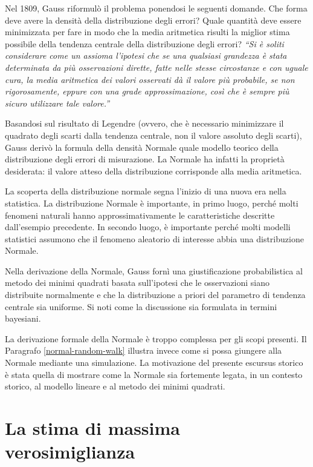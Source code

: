 \documentclass[
  11pt,
]{krantz}
\theoremstyle{definition}
\theoremstyle{definition}
\theoremstyle{definition}
\theoremstyle{definition}
\theoremstyle{remark}
\begin{document}
Nel 1809, Gauss riformulò il problema ponendosi le seguenti domande. Che forma deve avere la densità della distribuzione degli errori? Quale quantità deve essere minimizzata per fare in modo che la media aritmetica risulti la miglior stima possibile della tendenza centrale della distribuzione degli errori? \emph{``Si è soliti considerare come un assioma l'ipotesi che se una qualsiasi grandezza è stata determinata da più osservazioni dirette, fatte nelle stesse circostanze e con uguale cura, la media aritmetica dei valori osservati dà il valore più probabile, se non rigorosamente, eppure con una grade approssimazione, così che è sempre più sicuro utilizzare tale valore.''}

Basandosi sul risultato di Legendre (ovvero, che è necessario minimizzare il quadrato degli scarti dalla tendenza centrale, non il valore assoluto degli scarti), Gauss derivò la formula della densità Normale quale modello teorico della distribuzione degli errori di misurazione. La Normale ha infatti la proprietà desiderata: il valore atteso della distribuzione corrisponde alla media aritmetica.

La scoperta della distribuzione normale segna l'inizio di una nuova era nella statistica. La distribuzione Normale è importante, in primo luogo, perché molti fenomeni naturali hanno approssimativamente le caratteristiche descritte dall'esempio precedente. In secondo luogo, è importante perché molti modelli statistici assumono che il fenomeno aleatorio di interesse abbia una distribuzione Normale.

Nella derivazione della Normale, Gauss fornì una giustificazione probabilistica al metodo dei minimi quadrati basata sull'ipotesi che le osservazioni siano distribuite normalmente e che la distribuzione a priori del parametro di tendenza centrale sia uniforme. Si noti come la discussione sia formulata in termini bayesiani.

La derivazione formale della Normale è troppo complessa per gli scopi presenti. Il Paragrafo \ref{normal-random-walk} illustra invece come si possa giungere alla Normale mediante una simulazione. La motivazione del presente escursus storico è stata quella di mostrare come la Normale sia fortemente legata, in un contesto storico, al modello lineare e al metodo dei minimi quadrati.

\hypertarget{appendix:max-like}{%
\chapter{La stima di massima verosimiglianza}\label{appendix:max-like}}
\end{document}
